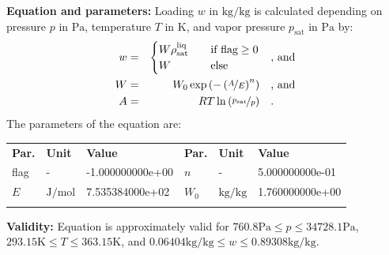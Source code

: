 \textbf{Equation and parameters:}
\newline
%
Loading $w$ in $\si{\kilogram\per\kilogram}$ is calculated depending on pressure $p$ in $\si{\pascal}$, temperature $T$ in $\si{\kelvin}$, and vapor pressure $p_\mathrm{sat}$ in $\si{\pascal}$ by:
%
\begin{equation*}
\begin{split}
w &=& \begin{cases} W \rho_\mathrm{sat}^{\mathrm{liq}} & \quad \text{if flag} \geq 0 \\ W & \quad \text{else} \end{cases} & \quad\text{, and} \\
W &=& W_0 \exp \left( - \left( \nicefrac{A}{E} \right) ^{n} \right) & \quad\text{, and} \\
A &=& R T \ln \left( \nicefrac{p_\mathrm{sat}}{p} \right) & \quad\text{.} \\
\end{split}
\end{equation*}
%
The parameters of the equation are:
%
\begin{longtable}[l]{lll|lll}
\toprule
\addlinespace
\textbf{Par.} & \textbf{Unit} & \textbf{Value} &	\textbf{Par.} & \textbf{Unit} & \textbf{Value} \\
\addlinespace
\midrule
\endhead

\bottomrule
\endfoot
\bottomrule
\endlastfoot
\addlinespace

flag & - & -1.000000000e+00 & $n$ & - & 5.000000000e-01 \\
$E$ & $\si{\joule\per\mole}$ & 7.535384000e+02 & $W_0$ & $\si{\kilogram\per\kilogram}$ & 1.760000000e+00 \\

\addlinespace\end{longtable}

\textbf{Validity:}
\newline
Equation is approximately valid for $760.8 \si{\pascal} \leq p \leq 34728.1 \si{\pascal}$,  $293.15 \si{\kelvin} \leq T \leq 363.15 \si{\kelvin}$, and $0.06404 \si{\kilogram\per\kilogram} \leq w \leq 0.89308 \si{\kilogram\per\kilogram}$.
\newline

